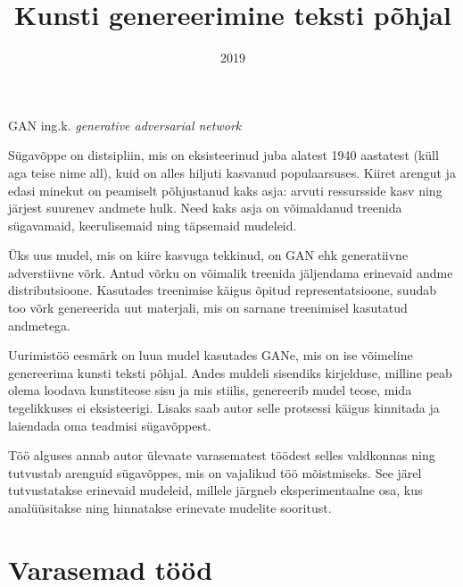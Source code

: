 \documentclass{vilgym}
\title{Kunsti genereerimine teksti põhjal}
\date{2019}
\begin{document}
    \maketitle
    \tableofcontents

    \begin{description}
		\let\originalitem\item
		\renewcommand*{\item}[1][]{\originalitem[#1]\label{def:#1}}

        \item{GAN} ing.k. \textit{generative adversarial network}
    \end{description}

	\newcommand*{\seedefinition}[1]{(\hyperref[def:#1]{vt~definitsiooni})}
    \newcommand*{\ingk}[1]{(\textit{ing. k. #1})}

    Sügavõppe on distsipliin, mis on eksisteerinud juba alatest 1940 aastatest (küll aga teise nime all), kuid on alles hiljuti kasvanud populaarsuses. Kiiret arengut ja edasi minekut on peamiselt põhjustanud kaks asja: arvuti ressursside kasv ning järjest suurenev andmete hulk. Need kaks asja on võimaldanud treenida sügavamaid, keerulisemaid ning täpsemaid mudeleid. \parencite{deeplearningbook}   

    Üks uus mudel, mis on kiire kasvuga tekkinud, on GAN ehk generatiivne adverstiivne võrk. Antud võrku on võimalik treenida jäljendama erinevaid andme distributsioone. Kasutades treenimise käigus õpitud representatsioone, suudab too võrk genereerida uut materjali, mis on sarnane treenimisel kasutatud andmetega. \parencite{gan}

    Uurimistöö eesmärk on luua mudel kasutades GANe, mis on ise võimeline genereerima kunsti teksti põhjal. Andes muldeli sisendiks kirjelduse, milline peab olema loodava kunstiteose sisu ja mis stiilis, genereerib mudel teose, mida tegelikkuses ei eksisteerigi. Lisaks saab autor selle protsessi käigus kinnitada ja laiendada oma teadmisi sügavõppest.

    Töö alguses annab autor ülevaate varasematest töödest selles valdkonnas ning tutvustab arenguid sügavõppes, mis on vajalikud töö mõistmiseks. See järel tutvustatakse erinevaid mudeleid, millele järgneb eksperimentaalne osa, kus analüüsitakse ning hinnatakse erinevate mudelite sooritust. 
    
    \section{Varasemad tööd}
\end{document}
